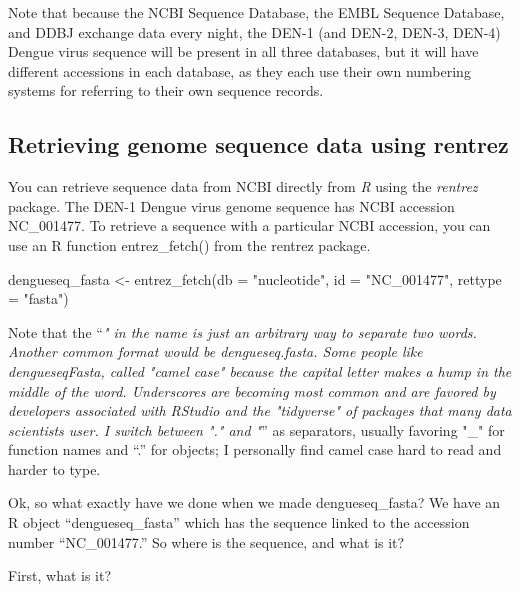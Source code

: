 \documentclass[
]{book}
\newenvironment{Shaded}{\begin{snugshade}}{\end{snugshade}}
\newcommand{\AttributeTok}[1]{\textcolor[rgb]{0.77,0.63,0.00}{#1}}
\newcommand{\FunctionTok}[1]{\textcolor[rgb]{0.00,0.00,0.00}{#1}}
\newcommand{\NormalTok}[1]{#1}
\newcommand{\OtherTok}[1]{\textcolor[rgb]{0.56,0.35,0.01}{#1}}
\newcommand{\StringTok}[1]{\textcolor[rgb]{0.31,0.60,0.02}{#1}}
\begin{document}
Note that because the NCBI Sequence Database, the EMBL Sequence Database, and DDBJ exchange data every night, the DEN-1 (and DEN-2, DEN-3, DEN-4) Dengue virus sequence will be present in all three databases, but it will have different accessions in each database, as they each use their own numbering systems for referring to their own sequence records.

\hypertarget{retrieving-genome-sequence-data-using-rentrez}{%
\subsection{Retrieving genome sequence data using rentrez}\label{retrieving-genome-sequence-data-using-rentrez}}

You can retrieve sequence data from NCBI directly from \emph{R} using the \emph{rentrez} package. The DEN-1 Dengue virus genome sequence has NCBI accession NC\_001477. To retrieve a sequence with a particular NCBI accession, you can use an R function entrez\_fetch() from the rentrez package.

\begin{Shaded}
\begin{Highlighting}[]
\NormalTok{dengueseq\_fasta }\OtherTok{\textless{}{-}} \FunctionTok{entrez\_fetch}\NormalTok{(}\AttributeTok{db =} \StringTok{"nucleotide"}\NormalTok{, }
                          \AttributeTok{id =} \StringTok{"NC\_001477"}\NormalTok{, }
                          \AttributeTok{rettype =} \StringTok{"fasta"}\NormalTok{)}
\end{Highlighting}
\end{Shaded}

Note that the ``\emph{" in the name is just an arbitrary way to separate two words. Another common format would be dengueseq.fasta. Some people like dengueseqFasta, called "camel case" because the capital letter makes a hump in the middle of the word. Underscores are becoming most common and are favored by developers associated with RStudio and the "tidyverse" of packages that many data scientists user. I switch between "." and "}'' as separators, usually favoring "\_" for function names and ``.'' for objects; I personally find camel case hard to read and harder to type.

Ok, so what exactly have we done when we made dengueseq\_fasta? We have an R object ``dengueseq\_fasta'' which has the sequence linked to the accession number ``NC\_001477.'' So where is the sequence, and what is it?

First, what is it?
\end{document}
